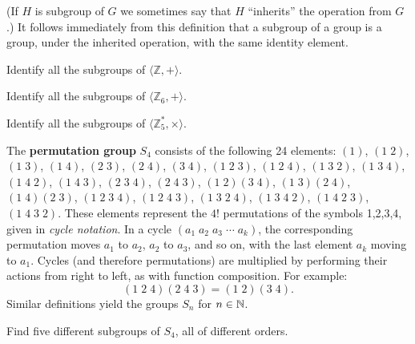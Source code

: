 (If \(H\) is subgroup of \(G\) we sometimes say that \(H\) ``inherits'' the operation from \(G\).) It follows immediately from this definition that a subgroup of a group is a group, under the inherited operation, with the same identity element.

\begin{problem}\label{prob:subgpex}
    \mbox{}
\begin{problemparts}
  \item Identify all the subgroups of \( \langle \mathbb{Z},+ \rangle \).
  \item Identify all the subgroups of \( \langle \mathbb{Z}_6,+ \rangle \).
  \item Identify all the subgroups of \( \langle \mathbb{Z}_5^*, \times \rangle \).
\end{problemparts}
\end{problem}

\begin{definition}
The \textbf{permutation group} $S_4$ consists of the following 24 elements: $(1)$, $(1\;2)$, $(1\;3)$, $(1\;4)$, $(2\;3)$, $(2\;4)$, $(3\;4)$, $(1\;2\;3)$, $(1\;2\;4)$,
$(1\;3\;2)$, $(1\;3\;4)$, $(1\;4\;2)$, $(1\;4\;3)$, $(2\;3\;4)$, $(2\;4\;3)$,
$(1\;2)(3\;4)$, $(1\;3)(2\;4)$, $(1\;4)(2\;3)$,
$(1\;2\;3\;4)$, $(1\;2\;4\;3)$, $(1\;3\;2\;4)$, $(1\;3\;4\;2)$, $(1\;4\;2\;3)$, $(1\;4\;3\;2)$. These elements represent the $4!$ permutations of the symbols 1,2,3,4, given in \textit{cycle notation}. In a cycle $(a_1 \; a_2 \; a_3\; \cdots \; a_k)$, the corresponding permutation moves $a_1$ to $a_2$, $a_2$ to $a_3$, and so on, with the last element $a_k$ moving to $a_1$. Cycles (and therefore permutations) are multiplied by performing their actions from right to left, as with function composition. For example:
\[
(1\;2\;4)(2\; 4\; 3) = (1\; 2)(3\; 4).
\]
Similar definitions yield the groups $S_n$ for $n \in \mathbb{N}$.
\begin{annotation}
\end{annotation}
\end{definition}

\begin{problem}\label{prob:s4subgroups}
Find five different subgroups of \( S_4 \), all of different orders.
\end{problem}

